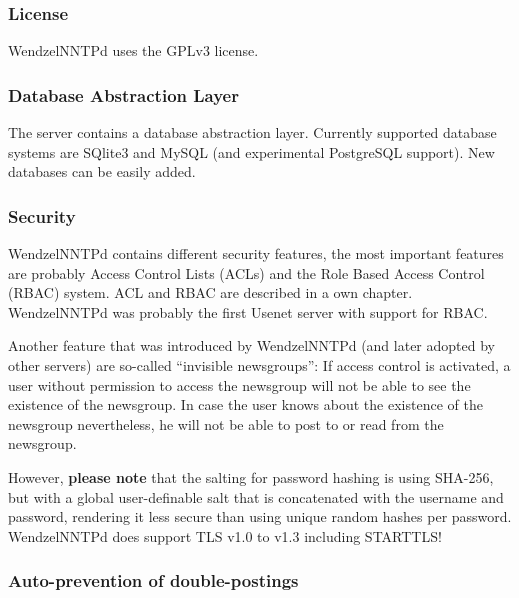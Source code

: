 \documentclass[12pt,fleqn,leqno]{scrbook}
\begin{document}
\hypertarget{license-1}{%
\subsubsection{License}\label{license-1}}

WendzelNNTPd uses the GPLv3 license.

\hypertarget{database-abstraction-layer-1}{%
\subsubsection{Database Abstraction
Layer}\label{database-abstraction-layer-1}}

The server contains a database abstraction layer. Currently supported
database systems are SQlite3 and MySQL (and experimental PostgreSQL
support). New databases can be easily added.

\hypertarget{security-1}{%
\subsubsection{Security}\label{security-1}}

WendzelNNTPd contains different security features, the most important
features are probably Access Control Lists (ACLs) and the Role Based
Access Control (RBAC) system. ACL and RBAC are described in a own
chapter. WendzelNNTPd was probably the first Usenet server with support
for RBAC.

Another feature that was introduced by WendzelNNTPd (and later adopted
by other servers) are so-called ``invisible newsgroups'': If access
control is activated, a user without permission to access the newsgroup
will not be able to see the existence of the newsgroup. In case the user
knows about the existence of the newsgroup nevertheless, he will not be
able to post to or read from the newsgroup.

However, \textbf{please note} that the salting for password hashing is
using SHA-256, but with a global user-definable salt that is
concatenated with the username and password, rendering it less secure
than using unique random hashes per password. WendzelNNTPd does support
TLS v1.0 to v1.3 including STARTTLS!

\hypertarget{auto-prevention-of-double-postings-1}{%
\subsubsection{Auto-prevention of
double-postings}\label{auto-prevention-of-double-postings-1}}
\end{document}
